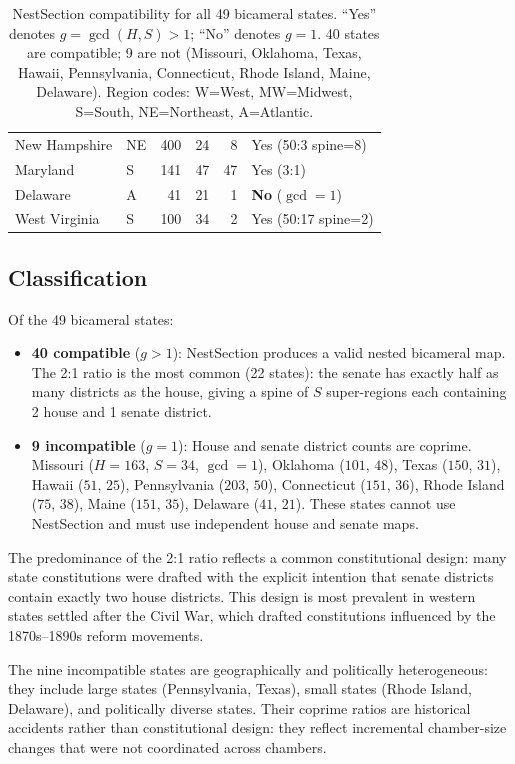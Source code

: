 \begin{table}[h]
\begin{tabular}{llrrrl}
New Hampshire & NE   & 400 & 24  & 8   & Yes (50:3 spine=8) \\
Maryland      & S    & 141 & 47  & 47  & Yes (3:1) \\
Delaware      & A    & 41  & 21  & 1   & \textbf{No} ($\gcd=1$) \\
West Virginia & S    & 100 & 34  & 2   & Yes (50:17 spine=2) \\
\bottomrule
\end{tabular}
\caption{NestSection compatibility for all 49 bicameral states.
  ``Yes'' denotes $g = \gcd(H,S) > 1$; ``No'' denotes $g = 1$.
  40 states are compatible; 9 are not (Missouri, Oklahoma, Texas, Hawaii,
  Pennsylvania, Connecticut, Rhode Island, Maine, Delaware).
  Region codes: W=West, MW=Midwest, S=South, NE=Northeast, A=Atlantic.}
\label{tab:ratios-all}
\end{table}

\subsection{Classification}
\label{sec:analysis:classification}

Of the 49 bicameral states:
\begin{itemize}
  \item \textbf{40 compatible} ($g > 1$): NestSection produces a valid
    nested bicameral map. The 2:1 ratio is the most common (22 states):
    the senate has exactly half as many districts as the house, giving a
    spine of $S$ super-regions each containing 2 house and 1 senate district.
  \item \textbf{9 incompatible} ($g = 1$): House and senate district counts
    are coprime. Missouri ($H=163$, $S=34$, $\gcd=1$), Oklahoma ($101$, $48$),
    Texas ($150$, $31$), Hawaii ($51$, $25$), Pennsylvania ($203$, $50$),
    Connecticut ($151$, $36$), Rhode Island ($75$, $38$), Maine ($151$, $35$),
    Delaware ($41$, $21$).
    These states cannot use NestSection and must use independent
    house and senate maps.
\end{itemize}

The predominance of the 2:1 ratio reflects a common constitutional design:
many state constitutions were drafted with the explicit intention that senate
districts contain exactly two house districts. This design is most prevalent
in western states settled after the Civil War, which drafted constitutions
influenced by the 1870s--1890s reform movements.

The nine incompatible states are geographically and politically heterogeneous:
they include large states (Pennsylvania, Texas), small states (Rhode Island,
Delaware), and politically diverse states. Their coprime ratios are historical
accidents rather than constitutional design: they reflect incremental chamber-size
changes that were not coordinated across chambers.

